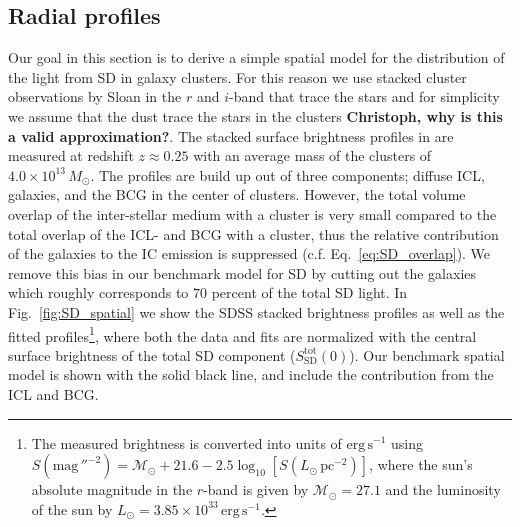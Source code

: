 \documentclass[10pt,aps,pra,reprint,amsmath,amsfonts,amssymb,showpacs,nofootinbib,floatfix]{revtex4-1}
\newcommand{\rmn}{\mathrm}
\newcommand{\sd}{\rmn{SD}}
\newcommand{\msun}{M_\odot}
\begin{document}
\subsection{Radial profiles}
\label{sect:SD_radial}
Our goal in this section is to derive a simple spatial model for the
distribution of the light from SD in galaxy clusters. For this reason
we use stacked cluster observations by Sloan in the $r$ and $i$-band
that trace the stars and for simplicity we assume that the dust trace
the stars in the clusters {\bf Christoph, why is this a valid
  approximation?}. The stacked surface brightness profiles in
\cite{2005MNRAS.358..949Z} are measured at redshift $z \approx 0.25$
with an average mass of the clusters of $4.0\times10^{13}\,\msun$. The
profiles are build up out of three components; diffuse ICL, galaxies,
and the BCG in the center of clusters. However, the total volume
overlap of the inter-stellar medium with a cluster is very small
compared to the total overlap of the ICL- and BCG with a cluster, thus
the relative contribution of the galaxies to the IC emission is
suppressed (c.f. Eq.~\ref{eq:SD_overlap}). We remove this bias in our
benchmark model for SD by cutting out the galaxies which roughly
corresponds to $70$ percent of the total SD light. In
Fig.~\ref{fig:SD_spatial} we show the SDSS stacked brightness profiles
as well as the fitted profiles\footnote{The measured brightness is
  converted into units of $\rmn{erg}\,\rmn{s}^{-1}$ using
  \cite{2010...book} $S(\rmn{mag}\,''^{-2}) =
  \mathcal{M}_\odot+21.6-2.5\log_{10}[S(L_\odot\,\rmn{pc}^{-2})]$,
  where the sun's absolute magnitude in the $r$-band is given by
  $\mathcal{M}_\odot=27.1$ \cite{1998gaas.book.....B} and the
  luminosity of the sun by $L_\odot=3.85\times10^{33}\,
  \rmn{erg}\,\rmn{s}^{-1}$.}, where both the data and fits are
normalized with the central surface brightness of the total SD
component ($S_\sd^\rmn{tot}(0)$). Our benchmark spatial model is shown
with the solid black line, and include the contribution from the ICL
and BCG.
\end{document}
